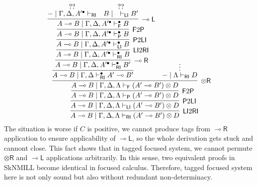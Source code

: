 \documentclass[submission,copyright,creativecommons]{eptcs}
\newcommand{\tr}{\otimes \mathsf{R}}
\newcommand{\lright}{\multimap \mathsf{R}}
\newcommand{\lleft}{\multimap \mathsf{L}}
\newcommand{\ot}{\otimes}
\newcommand{\lolli}{\multimap}
\newcommand{\RI}{\mathsf{RI}}
\newcommand{\LI}{\mathsf{LI}}
\newcommand{\Pass}{\mathsf{P}}
\newcommand{\F}{\mathsf{F}}
\begin{document}
\begin{displaymath}
  \infer[\LI 2 \RI]{A \lolli B \mid \Gamma , \Delta , \Lambda \vdash_{\RI} (A' \lolli B') \ot D}{
    \infer[\Pass 2 \LI]{A \lolli B \mid \Gamma , \Delta , \Lambda \vdash_{\LI} (A' \lolli B') \ot D}{
      \infer[\F 2 \Pass]{A \lolli B \mid \Gamma , \Delta , \Lambda \vdash_{\Pass} (A' \lolli B') \ot D}{
        \infer[\tr]{A \lolli B \mid \Gamma , \Delta , \Lambda \vdash_{\F} (A' \lolli B') \ot D}{
          \infer{A \lolli B \mid \Gamma , \Delta \vdash^{\bullet}_{\RI} A' \lolli B'}{
            \infer[\lright]{A \lolli B \mid \Gamma , \Delta , A'^{\bullet} \vdash^{\bullet}_{\RI} B'}{
              \infer[\LI 2 \RI]{A \lolli B \mid \Gamma , \Delta , A'^{\bullet} \vdash^{\bullet}_{\RI} B}{
                \infer[\Pass 2 \LI]{A \lolli B \mid \Gamma , \Delta , A'^{\bullet} \vdash^{\bullet}_{\LI} B}{
                  \infer[\F 2 \Pass]{A \lolli B \mid \Gamma , \Delta , A'^{\bullet} \vdash^{\bullet}_{\Pass} B}{
                    \infer[\lleft]{A \lolli B \mid \Gamma , \Delta , A'^{\bullet} \vdash^{\bullet}_{\F} B}{
                      \deduce{- \mid \Gamma , \Delta , A'^{\bullet} \vdash_{\RI}}{??}
                      &
                      \deduce{B \mid \quad \vdash_{\LI} B'}{??}
                    }
                  }
                }
              }
            }
          }
          &
          \deduce{- \mid \Lambda \vdash_{\RI} D}{\vdots}
        }
      }
    }
  }
\end{displaymath}
The situation is worse if $C$ is positive, we cannot produce tags from $\lright$ application to ensure applicability of $\lleft$, so the whole derivation gets stuck and cannont close.
This fact shows that in tagged focused system, we cannot permute $\tr$ and $\lleft$ applications arbitrarily.
In this sense, two equivalent proofs in SkNMILL become identical in focused calculus.
Therefore, tagged focused system here is not only sound but also without redundant non-determinacy.
\end{document}
